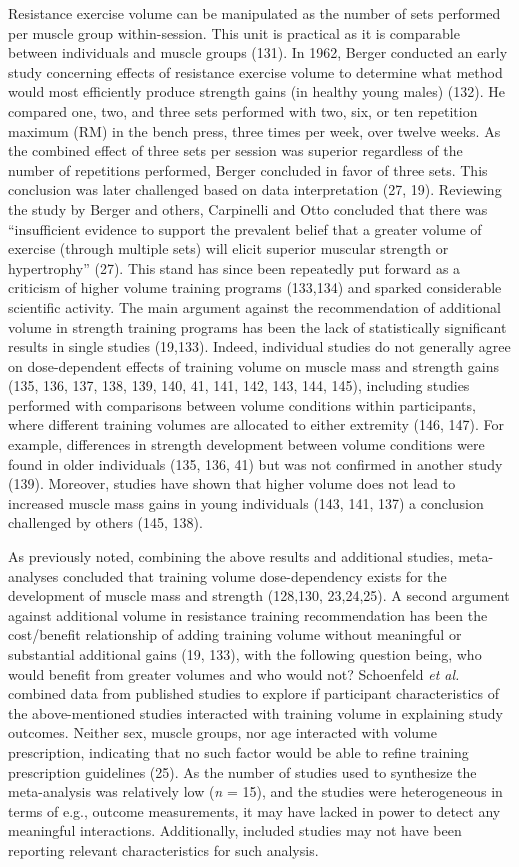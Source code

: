 \documentclass[twoside,10pt]{gihclass} %
\begin{document}
Resistance exercise volume can be manipulated as the number of sets performed per muscle group within-session. This unit is practical as it is comparable between individuals and muscle groups (131).
In 1962, Berger conducted an early study concerning effects of resistance exercise volume to determine what method would most efficiently produce strength gains (in healthy young males) (132). He compared one, two, and three sets performed with two, six, or ten repetition maximum (RM) in the bench press, three times per week, over twelve weeks. As the combined effect of three sets per session was superior regardless of the number of repetitions performed, Berger concluded in favor of three sets. This conclusion was later challenged based on data interpretation
(27, 19).
Reviewing the study by Berger and others, Carpinelli and Otto concluded that there was ``insufficient evidence to support the prevalent belief that a greater volume of exercise (through multiple sets) will elicit superior muscular strength or hypertrophy'' (27). This stand has since been repeatedly put forward as a criticism of higher volume training programs
(133,134) and sparked considerable scientific activity. The main argument against the recommendation of additional volume in strength training programs has been the lack of statistically significant results in single studies (19,133).
Indeed, individual studies do not generally agree on dose-dependent effects of training volume on muscle mass and strength gains
(135, 136, 137, 138, 139, 140, 41, 141, 142, 143, 144, 145),
including studies performed with comparisons between volume conditions within participants, where different training volumes are allocated to either extremity
(146, 147).
For example, differences in strength development between volume conditions were found in older individuals
(135, 136, 41)
but was not confirmed in another study
(139).
Moreover, studies have shown that higher volume does not lead to increased muscle mass gains in young individuals
(143, 141, 137)
a conclusion challenged by others
(145, 138).

As previously noted, combining the above results and additional studies, meta-analyses concluded that training volume dose-dependency exists for the development of muscle mass and strength
(128,130, 23,24,25).
A second argument against additional volume in resistance training recommendation has been the cost/benefit relationship of adding training volume without meaningful or substantial additional gains
(19, 133),
with the following question being, who would benefit from greater volumes and who would not?
Schoenfeld \emph{et al.} combined data from published studies to explore if participant characteristics of the above-mentioned studies interacted with training volume in explaining study outcomes. Neither sex, muscle groups, nor age interacted with volume prescription, indicating that no such factor would be able to refine training prescription guidelines
(25).
As the number of studies used to synthesize the meta-analysis was relatively low (\emph{n} = 15), and the studies were heterogeneous in terms of e.g., outcome measurements, it may have lacked in power to detect any meaningful interactions. Additionally, included studies may not have been reporting relevant characteristics for such analysis.
\end{document}
